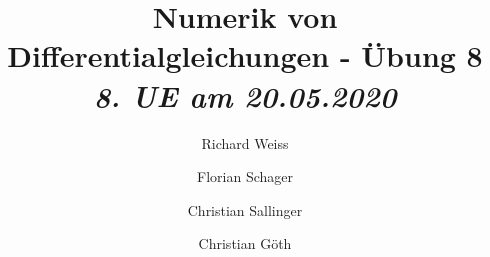 \documentclass{article}
\title
{
  Numerik von Differentialgleichungen - Übung 8 \\
  \vspace{4pt}
  \normalsize
  \textit{8. UE am 20.05.2020}
}
\author
{
  Richard Weiss       \and
  Florian Schager     \and
  Christian Sallinger \and
  Christian Göth
}
\date{}
\begin{document}
\renewcommand{\figurename}{Abbildung}
\maketitle


\pagebreak




\end{document}
